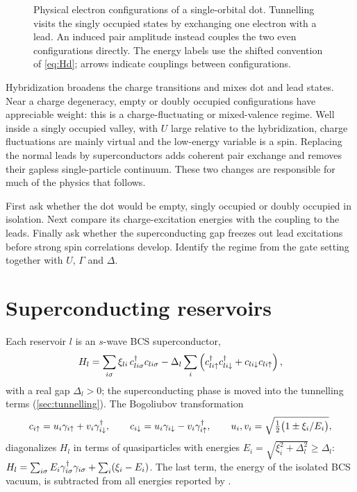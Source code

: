 \begin{figure}[htb]
\centering{}
\caption{Physical electron configurations of a single-orbital dot. Tunnelling
visits the singly occupied states by exchanging one electron with a lead.
An induced pair amplitude instead couples the two even configurations directly.
The energy labels use the shifted convention of \cref{eq:Hd}; arrows indicate
couplings between configurations.}
\label{fig:primer-dot}
\end{figure}

Hybridization broadens the charge transitions and mixes dot and lead states.
Near a charge degeneracy, empty or doubly occupied configurations have appreciable
weight: this is a charge-fluctuating or mixed-valence regime. Well inside a
singly occupied valley, with $U$ large relative to the hybridization, charge
fluctuations are mainly virtual and the low-energy variable is a spin. Replacing
the normal leads by superconductors adds coherent pair exchange and removes
their gapless single-particle continuum. These two changes are responsible for
much of the physics that follows.

\begin{physics}
First ask whether the dot would be empty, singly occupied or doubly occupied in
isolation. Next compare its charge-excitation energies with the coupling to the
leads. Finally ask whether the superconducting gap freezes out lead excitations
before strong spin correlations develop. Identify the regime from the gate
setting together with $U$, $\Gamma$ and $\Delta$.
\end{physics}

\section{Superconducting reservoirs}

Each reservoir $l$ is an $s$-wave BCS superconductor,
\begin{equation}\label{eq:bcs}
  H_l=\sum_{i\sigma}\xi_{li}\,c_{li\sigma}^\dagger c_{li\sigma}
      -\Delta_l\sum_i\left(c_{li{\uparrow}}^\dagger c_{li{\downarrow}}^\dagger+c_{li{\downarrow}}c_{li{\uparrow}}\right),
\end{equation}
with a real gap $\Delta_l>0$; the superconducting phase is moved into the tunnelling terms
(\cref{sec:tunnelling}). The Bogoliubov transformation
\begin{equation}\label{eq:bogoliubov}
  c_{i{\uparrow}}=u_i\gamma_{i{\uparrow}}+v_i\gamma_{i{\downarrow}}^\dagger,\qquad
  c_{i{\downarrow}}=u_i\gamma_{i{\downarrow}}-v_i\gamma_{i{\uparrow}}^\dagger,\qquad
  u_i,v_i=\sqrt{\tfrac12\bigl(1\pm\xi_i/E_i\bigr)},
\end{equation}
diagonalizes $H_l$ in terms of quasiparticles with energies $E_i=\sqrt{\xi_i^2+\Delta_l^2}\ge\Delta_l$:
$H_l=\sum_{i\sigma}E_i\gamma_{i\sigma}^\dagger\gamma_{i\sigma}+\sum_i(\xi_i-E_i)$. The last
term, the energy of the isolated BCS vacuum, is subtracted from all energies reported by
\pkg{}.

